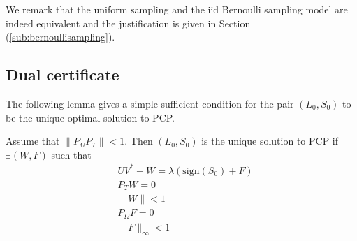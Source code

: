 We remark that the uniform sampling and the iid Bernoulli sampling model are indeed equivalent and the justification is given in Section (\ref{sub:bernoullisampling}).
\subsection{Dual certificate}
The following lemma gives a simple sufficient condition for the pair $(L_0,S_0)$ to be the unique optimal solution to PCP.

\begin{lemma}
Assume that $\|P_\Omega P_T \| < 1$. Then $(L_0,S_0)$ is the unique solution to PCP if $\exists (W, F)$ such that
\begin{equation}
\begin{aligned}
& UV^* + W = \lambda(\text{sign}(S_0) + F) \\
& P_T W = 0 \\
& \|W\|<1 \\
& P_\Omega F = 0 \\
& \|F\|_\infty < 1
\end{aligned}
\end{equation}

\end{lemma}


